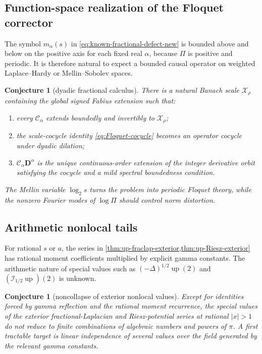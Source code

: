 \documentclass[11pt,oneside]{article}
\newtheorem{conjecture}[theorem]{Conjecture}
\theoremstyle{definition}
\newcommand{\upf}{\operatorname{up}}
\begin{document}
\subsection{Function-space realization of the Floquet corrector}

The symbol \(m_\alpha(s)\) in \eqref{eq:known-fractional-defect-new} is bounded above
and below on the positive axis for each fixed real \(\alpha\), because \(\Pi\) is
positive and periodic.  It is therefore natural to expect a bounded causal operator on
weighted Laplace--Hardy or Mellin--Sobolev spaces.

\begin{conjecture}[dyadic fractional calculus]\label{conj:Floquet-space}
There is a natural Banach scale \(\mathcal X_\rho\) containing the global signed Fabius
extension such that:
\begin{enumerate}
\item every \(\mathcal C_\alpha\) extends boundedly and invertibly to
\(\mathcal X_\rho\);
\item the scale-cocycle identity \eqref{eq:Floquet-cocycle} becomes an operator cocycle
under dyadic dilation;
\item \(\mathcal C_\alpha\mathbf D^\alpha\) is the unique continuous-order extension of
the integer derivative orbit satisfying the cocycle and a mild spectral boundedness
condition.
\end{enumerate}
The Mellin variable \(\log_2s\) turns the problem into periodic Floquet theory, while
the nonzero Fourier modes of \(\log\Pi\) should control norm distortion.
\end{conjecture}

\subsection{Arithmetic nonlocal tails}

For rational \(s\) or \(a\), the series in
\cref{thm:up-fraclap-exterior,thm:up-Riesz-exterior} has rational moment coefficients
multiplied by explicit gamma constants.  The arithmetic nature of special values such
as
\(
 (-\Delta)^{1/2}\upf(2)
\)
and \((\mathcal I_{1/2}\upf)(2)\) is unknown.

\begin{conjecture}[noncollapse of exterior nonlocal values]
\label{conj:nonlocal-arithmetic}
Except for identities forced by gamma reflection and the rational moment recurrence,
the special values of the exterior fractional-Laplacian and Riesz-potential series at
rational \(|x|>1\) do not reduce to finite combinations of algebraic numbers and powers
of \(\pi\).  A first tractable target is linear independence of several values over the
field generated by the relevant gamma constants.
\end{conjecture}
\end{document}
